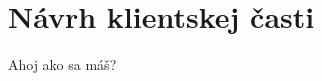 \documentclass[../projekt.tex]{subfiles}
\begin{document}
\section{Návrh klientskej časti}\label{navrhKlient}
Ahoj ako sa máš?
\end{document}
